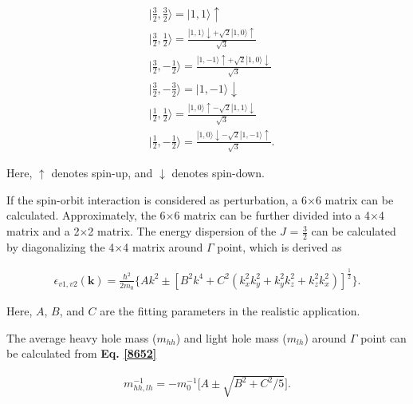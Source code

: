 \documentclass[a4paper, 12pt, titlepage,oneside,drop]{kthesis}
\begin{document}
\begin{equation}\begin{split}\label{99}
& \Big| \frac{3}{2}, \frac{3}{2} \Big\rangle = |1,1\rangle \uparrow \\
& \Big| \frac{3}{2}, \frac{1}{2} \Big\rangle = \frac{|1,1\rangle \downarrow + \sqrt{2} |1,0\rangle\uparrow}{\sqrt{3}} \\
& \Big| \frac{3}{2}, -\frac{1}{2} \Big\rangle = \frac{|1,-1\rangle \uparrow + \sqrt{2} |1,0\rangle\downarrow}{\sqrt{3}} \\
& \Big| \frac{3}{2}, -\frac{3}{2} \Big\rangle = |1,-1\rangle \downarrow \\
& \Big| \frac{1}{2}, \frac{1}{2} \Big\rangle = \frac{|1,0\rangle \uparrow - \sqrt{2} |1,1\rangle\downarrow}{\sqrt{3}} \\
& \Big| \frac{1}{2}, -\frac{1}{2} \Big\rangle = \frac{|1,0\rangle \downarrow - \sqrt{2} |1,-1\rangle\uparrow}{\sqrt{3}}. 
\end{split}
\end{equation}


Here, $\uparrow$ denotes spin-up, and $\downarrow$ denotes spin-down.


If the spin-orbit interaction is considered as perturbation, a 6$\times$6 matrix can be calculated. Approximately,  the 6$\times$6 matrix can be further divided into a 4$\times$4 matrix and a 2$\times$2 matrix. The energy dispersion
of the $J$ = $\frac{3}{2}$ can be calculated by diagonalizing the 4$\times$4 matrix around $\Gamma$ point, which is derived as

\begin{equation} \begin{split}\label{8652}
\epsilon_{v1, v2} (\textbf{k}) = \frac{\hbar^2}{2m_0}\Big\{Ak^2\pm[B^2k^4 + C^2 (k_x^{2}k_y^{2} + k_y^{2}k_z^{2} +k_z^{2}k_x^{2} )]^{\frac{1}{2}}\Big\}.
 \end{split}
\end{equation}

Here, $A$, $B$, and $C$ are the fitting parameters in the realistic application.

The average heavy hole mass ($m_{hh}$) and light hole mass ($m_{lh}$) around $\Gamma$ point can be calculated from  \textbf{Eq. \ref{8652}} 

\begin{equation}\begin{split}
m_{hh,lh}^{-1} = -{m_0^{-1}} \Big[A \pm \sqrt{B^2+C^2/5} \Big].
 \end{split}
\end{equation}
\end{document}

